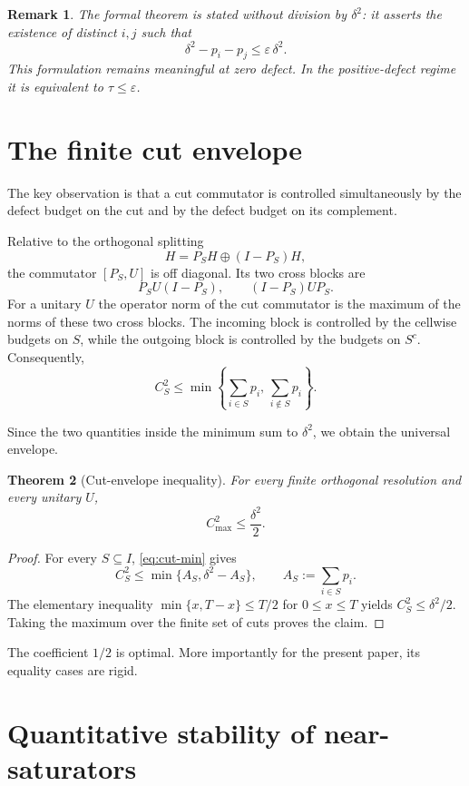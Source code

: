 \documentclass[11pt]{article}
\newtheorem{theorem}{Theorem}[section]
\newtheorem{remark}[theorem]{Remark}
\newcommand{\cmax}{C_{\max}}
\newcommand{\dd}{\delta}
\newcommand{\tauq}{\tau}
\begin{document}
\begin{remark}
The formal theorem is stated without division by $\dd^2$: it asserts the
existence of distinct $i,j$ such that
\[
  \dd^2-p_i-p_j\le \varepsilon\,\dd^2.
\]
This formulation remains meaningful at zero defect.  In the positive-defect
regime it is equivalent to $\tauq\le\varepsilon$.
\end{remark}

\section{The finite cut envelope}

The key observation is that a cut commutator is controlled simultaneously by
the defect budget on the cut and by the defect budget on its complement.

Relative to the orthogonal splitting
\[
  H=P_SH\oplus (I-P_S)H,
\]
the commutator $[P_S,U]$ is off diagonal.  Its two cross blocks are
\[
  P_SU(I-P_S),
  \qquad
  (I-P_S)UP_S.
\]
For a unitary $U$ the operator norm of the cut commutator is the maximum of
the norms of these two cross blocks.  The incoming block is controlled by the
cellwise budgets on $S$, while the outgoing block is controlled by the
budgets on $S^c$.  Consequently,
\begin{equation}\label{eq:cut-min}
  C_S^2
  \le
  \min\left\{
    \sum_{i\in S}p_i,\,
    \sum_{i\notin S}p_i
  \right\}.
\end{equation}

Since the two quantities inside the minimum sum to $\dd^2$, we obtain the
universal envelope.

\begin{theorem}[Cut-envelope inequality]\label{thm:envelope}
For every finite orthogonal resolution and every unitary $U$,
\[
  \boxed{\cmax^2\le\frac{\dd^2}{2}}.
\]
\end{theorem}

\begin{proof}
For every $S\subseteq I$, \eqref{eq:cut-min} gives
\[
  C_S^2
  \le
  \min\{A_S,\dd^2-A_S\},
  \qquad
  A_S:=\sum_{i\in S}p_i.
\]
The elementary inequality
$\min\{x,T-x\}\le T/2$ for $0\le x\le T$ yields
$C_S^2\le\dd^2/2$.  Taking the maximum over the finite set of cuts proves the
claim.
\end{proof}

The coefficient $1/2$ is optimal.  More importantly for the present paper,
its equality cases are rigid.

\section{Quantitative stability of near-saturators}
\end{document}
